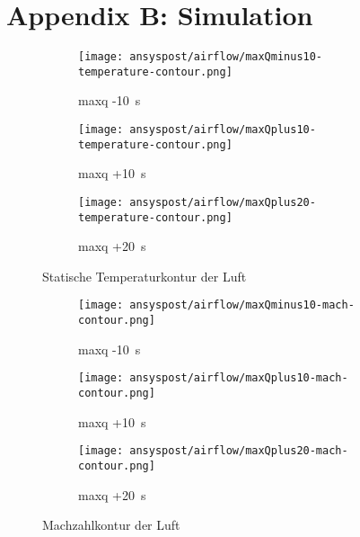 \section*{Appendix B: Simulation}\label{Anh:simulation}

\begin{figure}[H]
    \centering

    \begin{subfigure}{\textwidth}
        \centering
        \texttt{[image: ansyspost/airflow/maxQminus10-temperature-contour.png]}
        \caption{\ac{maxq} -\SI{10}{\second}}
        \label{fig:maxQminus10_temp_contour}
    \end{subfigure}

    \begin{subfigure}{\textwidth}
        \centering
        \texttt{[image: ansyspost/airflow/maxQplus10-temperature-contour.png]}
        \caption{\ac{maxq} +\SI{10}{\second}}
        \label{fig:maxQplus10_temp_contour}
    \end{subfigure}

    \begin{subfigure}{\textwidth}
        \centering
        \texttt{[image: ansyspost/airflow/maxQplus20-temperature-contour.png]}
        \caption{\ac{maxq} +\SI{20}{\second}}
        \label{fig:maxQplus20_temp_contour}
    \end{subfigure}

    \caption{Statische Temperaturkontur der Luft}
    \label{fig:airflow_temp_contour_continued}
\end{figure}

\begin{figure}[H]
    \centering

    \begin{subfigure}{\textwidth}
        \centering
        \texttt{[image: ansyspost/airflow/maxQminus10-mach-contour.png]}
        \caption{\ac{maxq} -\SI{10}{\second}}
        \label{fig:maxQminus10_mach_contour}
    \end{subfigure}

    \begin{subfigure}{\textwidth}
        \centering
        \texttt{[image: ansyspost/airflow/maxQplus10-mach-contour.png]}
        \caption{\ac{maxq} +\SI{10}{\second}}
        \label{fig:maxQplus10_mach_contour}
    \end{subfigure}

    \begin{subfigure}{\textwidth}
        \centering
        \texttt{[image: ansyspost/airflow/maxQplus20-mach-contour.png]}
        \caption{\ac{maxq} +\SI{20}{\second}}
        \label{fig:maxQplus20_mach_contour}
    \end{subfigure}

    \caption{Machzahlkontur der Luft}
    \label{fig:airflow_mach_contour_continued}
\end{figure}

